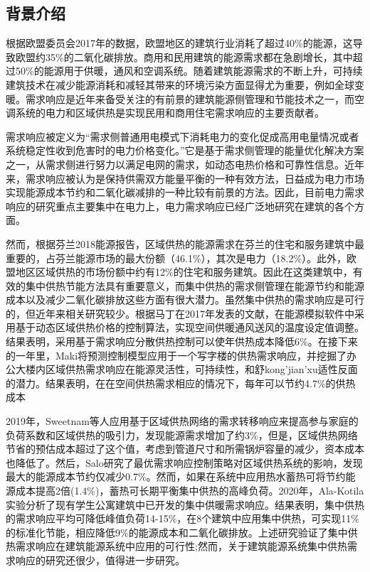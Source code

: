 \documentclass[hyperref]{ctexart}
\begin{document}
	\begin{multicols}{2}
		\section{背景介绍}
		根据欧盟委员会2017年的数据，欧盟地区的建筑行业消耗了超过40\%的能源，这导致欧盟约35\%的二氧化碳排放\cite{article1}。商用和民用建筑的能源需求都在急剧增长，其中超过50\%的能源用于供暖，通风和空调系统\cite{article2,article3}。随着建筑能源需求的不断上升，可持续建筑技术在减少能源消耗和减轻其带来的环境污染方面显得尤为重要，例如全球变暖\cite{article4}。需求响应是近年来备受关注的有前景的建筑能源侧管理和节能技术之一\cite{article5,article6}，而空调系统的电力和区域供热是实现民用和商用住宅需求响应的主要贡献者\cite{article7,article8}。
		\par
		需求响应被定义为“需求侧普通用电模式下消耗电力的变化促成高用电量情况或者系统稳定性收到危害时的电力价格变化。”\cite{article9}它是基于需求侧管理的能量优化解决方案之一，从需求侧进行努力以满足电网的需求，如动态电热价格和可靠性信息\cite{article10}。近年来，需求响应被认为是保持供需双方能量平衡的一种有效方法，日益成为电力市场实现能源成本节约和二氧化碳减排的一种比较有前景的方法\cite{article11,article12}。因此，目前电力需求响应的研究重点主要集中在电力\cite{article13}上，电力需求响应已经广泛地研究在建筑的各个方面。
		\par
		然而，根据芬兰2018能源报告\cite{article14}，区域供热的能源需求在芬兰的住宅和服务建筑中最重要的，占芬兰能源市场的最大份额（46.1\%），其次是电力（18.2\%）。此外，欧盟地区区域供热的市场份额中约有12\%的住宅和服务建筑。因此在这类建筑中，有效的集中供热节能方法具有重要意义，而集中供热的需求侧管理在能源节约和能源成本以及减少二氧化碳排放这些方面有很大潜力。虽然集中供热的需求响应是可行的，但近年来相关研究较少。根据马丁在2017年发表的文献，在能源模拟软件中采用基于动态区域供热价格的控制算法，实现空间供暖通风送风的温度设定值调整。结果表明，采用基于需求响应分散供热控制可以使年供热成本降低6\%。在接下来的一年里，Maki将预测控制模型应用于一个写字楼的供热需求响应，并挖掘了办公大楼内区域供热需求响应在能源灵活性，可持续性，和舒kong'jian'xu适性反面的潜力。结果表明，在在空间供热需求相应的情况下，每年可以节约4.7\%的供热成本
		\par
		2019年，Sweetnam等人应用基于区域供热网络的需求转移响应来提高参与家庭的负荷系数和区域供热的吸引力，发现能源需求增加了约3\%，但是，区域供热网络节省的预估成本超过了这个值，考虑到管道尺寸和所需锅炉容量的减少，资本成本也降低了。然后，Salo研究了最优需求响应控制策略对区域供热系统的影响，发现最大的能源成本节约仅减少0.7\%。然而，如果在系统中应用热水蓄热可将节约能源成本提高2倍(1.4\%)，蓄热可长期平衡集中供热的高峰负荷。2020年，Ala-Kotila实验分析了现有学生公寓建筑中已开发的集中供暖需求响应。结果表明，集中供热的需求响应平均可降低峰值负荷14-15\%，在8个建筑中应用集中供热，可实现11\%的标准化节能，相应降低9\%的能源成本和二氧化碳排放。上述研究验证了集中供热需求响应在建筑能源系统中应用的可行性;然而，关于建筑能源系统集中供热需求响应的研究还很少，值得进一步研究。

\end{multicols}
\end{document}
